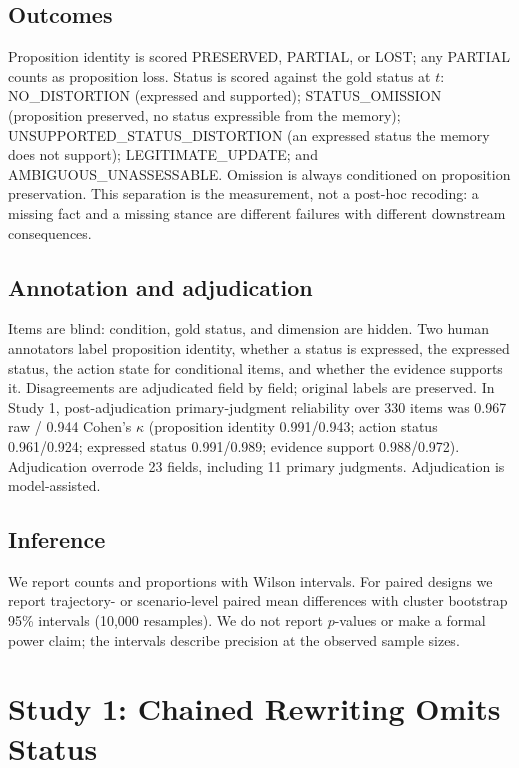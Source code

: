 \documentclass{ecai}
\newcommand{\st}[1]{\textsc{#1}}
\begin{document}
\subsection{Outcomes}

Proposition identity is scored \st{PRESERVED}, \st{PARTIAL}, or \st{LOST}; any
\st{PARTIAL} counts as proposition loss. Status is scored against the gold
status at $t$: \st{NO\_DISTORTION} (expressed and supported);
\st{STATUS\_OMISSION} (proposition preserved, no status expressible from the
memory); \st{UNSUPPORTED\_STATUS\_DISTORTION} (an expressed status the memory
does not support); \st{LEGITIMATE\_UPDATE}; and \st{AMBIGUOUS\_UNASSESSABLE}.
Omission is always conditioned on proposition preservation. This separation is
the measurement, not a post-hoc recoding: a missing fact and a missing stance
are different failures with different downstream consequences.

\subsection{Annotation and adjudication}

Items are blind: condition, gold status, and dimension are hidden. Two human
annotators label proposition identity, whether a status is expressed, the expressed status,
the action state for conditional items, and whether the evidence supports it.
Disagreements are adjudicated field by field; original labels are preserved. In
Study 1, post-adjudication primary-judgment reliability over 330 items was 0.967
raw / 0.944 Cohen's $\kappa$ (proposition identity 0.991/0.943; action status
0.961/0.924; expressed status 0.991/0.989; evidence support 0.988/0.972).
Adjudication overrode 23 fields, including 11 primary judgments. Adjudication is
model-assisted.

\subsection{Inference}

We report counts and proportions with Wilson intervals. For paired designs we
report trajectory- or scenario-level paired mean differences with cluster
bootstrap 95\% intervals (10,000 resamples). We do not report $p$-values or make
a formal power claim; the intervals describe precision at the observed sample
sizes.

\section{Study 1: Chained Rewriting Omits Status}
\end{document}
